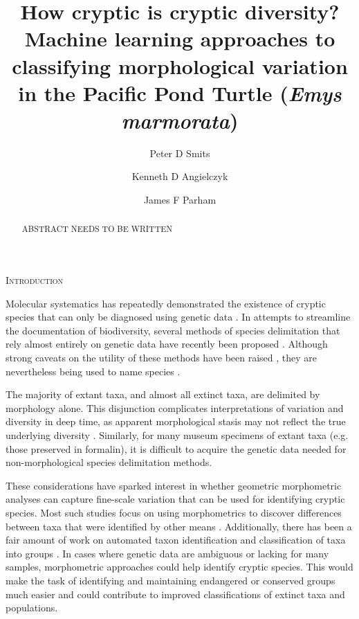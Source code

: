 \documentclass[12pt,letterpaper]{article}
\title{How cryptic is cryptic diversity? Machine learning approaches to classifying morphological variation in the Pacific Pond Turtle (\textit{Emys marmorata})}
\author[1]{Peter D Smits}%
\author[1,2]{Kenneth D Angielczyk}%
\author[3]{James F Parham}%
\affil[1]{Committee on Evolutionary Biology, University of Chicago}
\affil[2]{Integrative Research Center, Field Museum of Natural History}
\affil[3]{Department of Geological Sciences, California State University -- Fullerton}
\renewcommand{\section}[1]{%
\bigskip
\begin{center}
\begin{Large}
\normalfont\scshape #1
\medskip
\end{Large}
\end{center}}
\begin{document}
\maketitle
{}

\linenumbers
\modulolinenumbers[2]

\begin{abstract}
  ABSTRACT NEEDS TO BE WRITTEN
\end{abstract}

\section{Introduction}

Molecular systematics has repeatedly demonstrated the existence of cryptic species that can only be diagnosed using genetic data \citep{Stuart2006,Bickford2007,SchlickSteiner2007,Pfenninger2007,Clare2011,Funk2012}. In attempts to streamline the documentation of biodiversity, several methods of species delimitation that rely almost entirely on genetic data have recently been proposed \citep{Yang2010b}. Although strong caveats on the utility of these methods have been raised \citep{Bauer2000,Carstens2013}, they are nevertheless being used to name species \citep{Leache2010,Spinks2014}.

The majority of extant taxa, and almost all extinct taxa, are delimited by morphology alone. This disjunction complicates interpretations of variation and diversity in deep time, as apparent morphological stasis may not reflect the true underlying diversity \citep{Eldredge1972,Gould1977a,Hunt2008,VanBocxlaer2013}. Similarly, for many museum specimens of extant taxa (e.g. those preserved in formalin), it is difficult to acquire the genetic data needed for non-morphological species delimitation methods.

These considerations have sparked interest in whether geometric morphometric analyses can capture fine-scale variation that can be used for identifying cryptic species. Most such studies focus on using morphometrics to discover differences between taxa that were identified by other means \citep{Polly2003,Zelditch2004,Gaubert2005b,Gunduz2007,Polly2007a,Demandt2009}. Additionally, there has been a fair amount of work on automated taxon identification and classification of taxa into groups \citep{Baylac2003,Dobigny2003,MacLeod2007,VandenBrink2011}. In cases where genetic data are ambiguous or lacking for many samples, morphometric approaches could help identify cryptic species. This would make the task of identifying and maintaining endangered or conserved groups much easier and could contribute to improved classifications of extinct taxa and populations.
\end{document}

